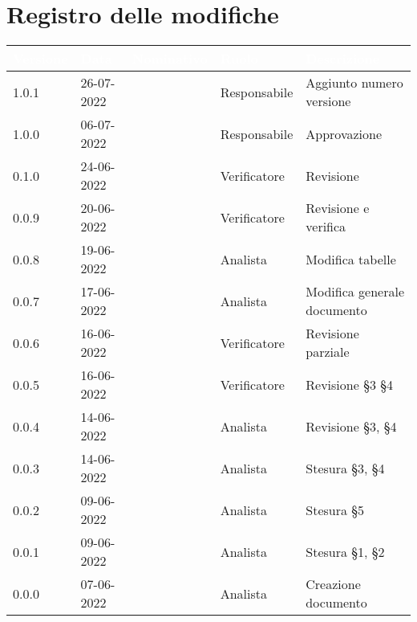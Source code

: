\section*{Registro delle modifiche}
{

\newlength{\freewidth}
\setlength{\freewidth}{\dimexpr\textwidth-10\tabcolsep}
\renewcommand{\arraystretch}{1.5}
\centering
\setlength{\aboverulesep}{0pt}
\setlength{\belowrulesep}{0pt}
\begin{longtable}{C{.13\freewidth} C{.15\freewidth} C{.26\freewidth} C{.18\freewidth} C{.282379\freewidth}}
	\toprule
{}
\textcolor{white}{\textbf{Versione}}&
\textcolor{white}{\textbf{Data}}&
\textcolor{white}{\textbf{Nominativo}}&
\textcolor{white}{\textbf{Ruolo}}&
\textcolor{white}{\textbf{Descrizione}}\\	
\toprule
\endhead

1.0.1 & 26-07-2022 & \marcov{} & Responsabile & Aggiunto numero versione \\
1.0.0 & 06-07-2022 & \marcov{} & Responsabile & Approvazione \\
0.1.0 & 24-06-2022 & \giulio{} & Verificatore & Revisione \\
0.0.9 & 20-06-2022 & \angela{} & Verificatore & Revisione e verifica \\
0.0.8 & 19-06-2022 & \matteo{} & Analista & Modifica tabelle \\
0.0.7 & 17-06-2022 & \matteo{} & Analista & Modifica generale documento \\
0.0.6 & 16-06-2022 & \angela{} & Verificatore & Revisione parziale \\
0.0.5 & 16-06-2022 & \marcob{} & Verificatore & Revisione \S 3 \S 4 \\
0.0.4 & 14-06-2022 & \matteo{} & Analista & Revisione \S 3, \S 4\\
0.0.3 & 14-06-2022 & \ruth{} & Analista & Stesura \S 3, \S 4\\
0.0.2 & 09-06-2022 & \matteo{} & Analista & Stesura \S 5\\
0.0.1 & 09-06-2022 & \marcob{} & Analista & Stesura \S 1, \S 2\\
0.0.0 & 07-06-2022 & \matteo{} & Analista & Creazione documento\\	
\bottomrule
\end{longtable}
}
